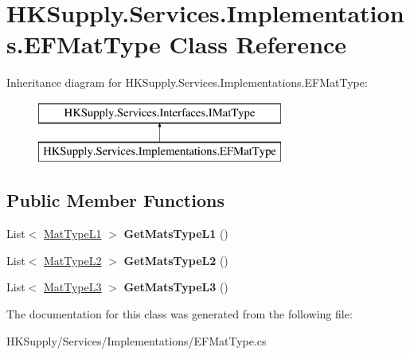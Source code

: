 \hypertarget{class_h_k_supply_1_1_services_1_1_implementations_1_1_e_f_mat_type}{}\section{H\+K\+Supply.\+Services.\+Implementations.\+E\+F\+Mat\+Type Class Reference}
\label{class_h_k_supply_1_1_services_1_1_implementations_1_1_e_f_mat_type}
Inheritance diagram for H\+K\+Supply.\+Services.\+Implementations.\+E\+F\+Mat\+Type\+:\begin{figure}[H]
\begin{center}
\leavevmode
\includegraphics[height=2.000000cm]{class_h_k_supply_1_1_services_1_1_implementations_1_1_e_f_mat_type}
\end{center}
\end{figure}
\subsection*{Public Member Functions}
\begin{DoxyCompactItemize}
\item 
\mbox{\label{class_h_k_supply_1_1_services_1_1_implementations_1_1_e_f_mat_type_a6db8e353508756947b63227544b746de}} 
List$<$ \mbox{\hyperlink{class_h_k_supply_1_1_models_1_1_mat_type_l1}{Mat\+Type\+L1}} $>$ {\bfseries Get\+Mats\+Type\+L1} ()
\item 
\mbox{\label{class_h_k_supply_1_1_services_1_1_implementations_1_1_e_f_mat_type_aa0d45453abf2ef7385620d181a0e75d8}} 
List$<$ \mbox{\hyperlink{class_h_k_supply_1_1_models_1_1_mat_type_l2}{Mat\+Type\+L2}} $>$ {\bfseries Get\+Mats\+Type\+L2} ()
\item 
\mbox{\label{class_h_k_supply_1_1_services_1_1_implementations_1_1_e_f_mat_type_a221586b968f1d7a536d195c1de062d75}} 
List$<$ \mbox{\hyperlink{class_h_k_supply_1_1_models_1_1_mat_type_l3}{Mat\+Type\+L3}} $>$ {\bfseries Get\+Mats\+Type\+L3} ()
\end{DoxyCompactItemize}


The documentation for this class was generated from the following file\+:\begin{DoxyCompactItemize}
\item 
H\+K\+Supply/\+Services/\+Implementations/E\+F\+Mat\+Type.\+cs\end{DoxyCompactItemize}
